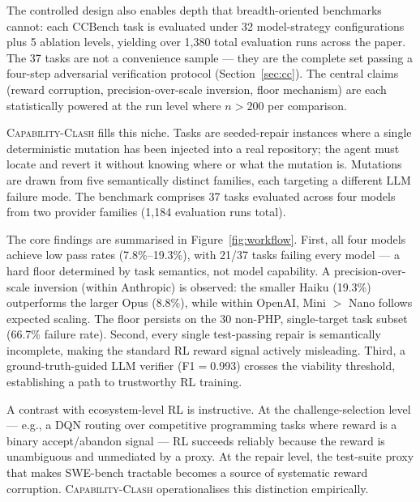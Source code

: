 \documentclass[sigconf,review,anonymous]{acmart}
\newcommand{\ccbench}{\textsc{Capability-Clash}}
\begin{document}
The controlled design also enables depth that breadth-oriented benchmarks cannot: each CCBench task is evaluated under 32 model-strategy configurations plus 5 ablation levels, yielding over 1,380 total evaluation runs across the paper. The 37 tasks are not a convenience sample — they are the complete set passing a four-step adversarial verification protocol (Section~\ref{sec:cc}). The central claims (reward corruption, precision-over-scale inversion, floor mechanism) are each statistically powered at the run level where $n > 200$ per comparison.

\ccbench{} fills this niche. Tasks are seeded-repair instances where a single deterministic mutation has been injected into a real repository; the agent must locate and revert it without knowing where or what the mutation is. Mutations are drawn from five semantically distinct families, each targeting a different LLM failure mode. The benchmark comprises 37 tasks evaluated across four models from two provider families (1{,}184 evaluation runs total).

The core findings are summarised in Figure~\ref{fig:workflow}. First, all four models achieve low pass rates (7.8\%--19.3\%), with 21/37 tasks failing every model — a hard floor determined by task semantics, not model capability. A precision-over-scale inversion (within Anthropic) is observed: the smaller Haiku (19.3\%) outperforms the larger Opus (8.8\%), while within OpenAI, Mini $>$ Nano follows expected scaling. The floor persists on the 30 non-PHP, single-target task subset (66.7\% failure rate). Second, every single test-passing repair is semantically incomplete, making the standard RL reward signal actively misleading. Third, a ground-truth-guided LLM verifier (F1$=$0.993) crosses the viability threshold, establishing a path to trustworthy RL training.

A contrast with ecosystem-level RL is instructive. At the challenge-selection level — e.g., a DQN routing over competitive programming tasks where reward is a binary accept/abandon signal — RL succeeds reliably because the reward is unambiguous and unmediated by a proxy. At the repair level, the test-suite proxy that makes SWE-bench tractable becomes a source of systematic reward corruption. \ccbench{} operationalises this distinction empirically.
\end{document}
